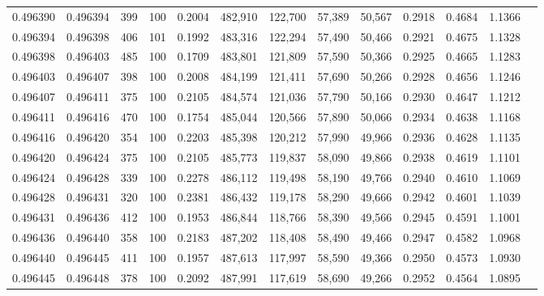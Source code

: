 \begin{tabular}{rrrrrrrrrrrrr}
0.496390 & 0.496394 &   399 & 100 &                                     0.2004 & 482,910 & 122,700 &  57,389 &  50,567 & 0.2918 & 0.4684 & 1.1366 \\
0.496394 & 0.496398 &   406 & 101 &                                     0.1992 & 483,316 & 122,294 &  57,490 &  50,466 & 0.2921 & 0.4675 & 1.1328 \\
0.496398 & 0.496403 &   485 & 100 &                                     0.1709 & 483,801 & 121,809 &  57,590 &  50,366 & 0.2925 & 0.4665 & 1.1283 \\
0.496403 & 0.496407 &   398 & 100 &                                     0.2008 & 484,199 & 121,411 &  57,690 &  50,266 & 0.2928 & 0.4656 & 1.1246 \\
0.496407 & 0.496411 &   375 & 100 &                                     0.2105 & 484,574 & 121,036 &  57,790 &  50,166 & 0.2930 & 0.4647 & 1.1212 \\
0.496411 & 0.496416 &   470 & 100 &                                     0.1754 & 485,044 & 120,566 &  57,890 &  50,066 & 0.2934 & 0.4638 & 1.1168 \\
0.496416 & 0.496420 &   354 & 100 &                                     0.2203 & 485,398 & 120,212 &  57,990 &  49,966 & 0.2936 & 0.4628 & 1.1135 \\
0.496420 & 0.496424 &   375 & 100 &                                     0.2105 & 485,773 & 119,837 &  58,090 &  49,866 & 0.2938 & 0.4619 & 1.1101 \\
0.496424 & 0.496428 &   339 & 100 &                                     0.2278 & 486,112 & 119,498 &  58,190 &  49,766 & 0.2940 & 0.4610 & 1.1069 \\
0.496428 & 0.496431 &   320 & 100 &                                     0.2381 & 486,432 & 119,178 &  58,290 &  49,666 & 0.2942 & 0.4601 & 1.1039 \\
0.496431 & 0.496436 &   412 & 100 &                                     0.1953 & 486,844 & 118,766 &  58,390 &  49,566 & 0.2945 & 0.4591 & 1.1001 \\
0.496436 & 0.496440 &   358 & 100 &                                     0.2183 & 487,202 & 118,408 &  58,490 &  49,466 & 0.2947 & 0.4582 & 1.0968 \\
0.496440 & 0.496445 &   411 & 100 &                                     0.1957 & 487,613 & 117,997 &  58,590 &  49,366 & 0.2950 & 0.4573 & 1.0930 \\
0.496445 & 0.496448 &   378 & 100 &                                     0.2092 & 487,991 & 117,619 &  58,690 &  49,266 & 0.2952 & 0.4564 & 1.0895 \\

\end{tabular}
